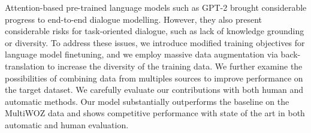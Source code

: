 Attention-based pre-trained language models such as GPT-2 brought considerable progress to end-to-end dialogue modelling. However, they also present considerable risks for task-oriented dialogue, such as lack of knowledge grounding or diversity. To address these issues, we introduce modified training objectives for language model finetuning, and we employ massive data augmentation via back-translation to increase the diversity of the training data. We further examine the possibilities of combining data from multiples sources to improve performance on the target dataset. We carefully evaluate our contributions with both human and automatic methods. Our model substantially outperforms the baseline on the MultiWOZ data and shows competitive performance with state of the art in both automatic and human evaluation.
